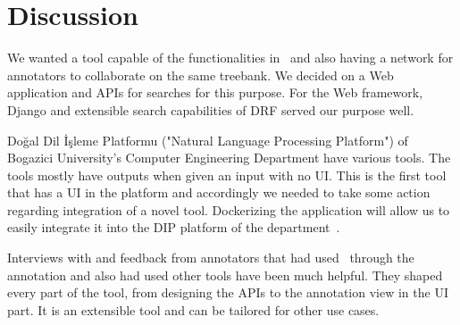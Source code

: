 \section{Discussion}
\label{sec:discussion}

We wanted a tool capable of the functionalities in \boatvone\ and also having a network for annotators to collaborate on the same treebank.
We decided on a Web application and APIs for searches for this purpose.
For the Web framework, Django and extensible search capabilities of DRF served our purpose well.

Doğal Dil İşleme Platformu ("Natural Language Processing Platform") of Bogazici University's Computer Engineering Department have various tools.
The tools mostly have outputs when given an input with no UI.
This is the first tool that has a UI in the platform and accordingly we needed to take some action regarding integration of a novel tool.
Dockerizing the application will allow us to easily integrate it into the DIP platform of the department~\cite{DIP}.

Interviews with and feedback from annotators that had used \boatvone\ through the \bountreebank{} annotation and also had used other tools have been much helpful.
They shaped every part of the tool, from designing the APIs to the annotation view in the UI part.
It is an extensible tool and can be tailored for other use cases.
